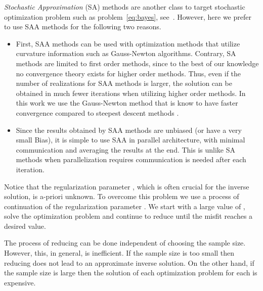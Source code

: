 \documentclass[12pt]{article}
\begin{document}
\emph{Stochastic Approximation} (SA) methods are another class to target stochastic optimization problem such as problem~\eqref{eq:bayes}, see~\cite{JuditskyLanNemirovskiShapiro2009}. However, here we prefer to use SAA methods for the following two reasons.
\begin{itemize}
\item First, SAA methods can be used with optimization methods that utilize curvature information such as Gauss-Newton algorithms. Contrary, SA methods are limited to first order methods, since to the best of our knowledge no convergence theory exists for higher order methods. Thus, even if the number of realizations for SAA methods is larger, the solution can be obtained in much fewer iterations when utilizing higher order methods. In this work we use the Gauss-Newton method that is know to have faster convergence compared to steepest descent methods \cite{pratt1999,hao}.
\item Since the results obtained by SAA methods are unbiased (or have a very small Bias), it is simple to use SAA in parallel architecture, with minimal communication and averaging the results at the end. This is unlike SA methods when parallelization requires communication is needed after each iteration.
\end{itemize}

\bigskip

Notice that the regularization parameter , which is often crucial for the inverse solution, is a-priori unknown. To overcome this problem we use a process of continuation of the regularization
parameter \cite{hao}. We start with a large value of , solve the optimization problem and continue to reduce  until the misfit reaches a desired value.

The process of reducing  can be done independent of choosing the sample size. However, this, in general, is inefficient. If the sample size is too small then reducing  does not lead to an approximate inverse solution. On the other hand, if the sample size is large then the solution of each optimization problem for each  is expensive.
\end{document}

